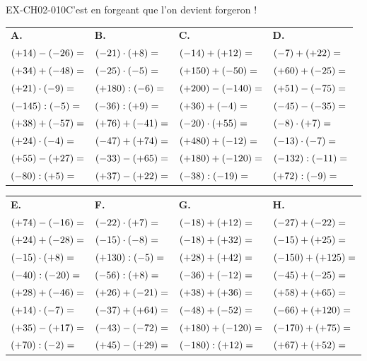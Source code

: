 \documentclass[12pt, a4paper]{article}
\begin{document}
\begin{exercice}{EX-CH02-010}{C’est en forgeant que l’on devient forgeron !}

{\small
\bigskip
\def\arraystretch{1.25}
\begin{tabularx}{\linewidth}{*{4}{X}}
\textbf{A.} & \textbf{B.} & \textbf{C.} & \textbf{D.} \\
$(+14)-(-26)= \dotfill$ & $(-21)\cdot(+8)= \dotfill$ & $(-14)+(+12)= \dotfill$ & $(-7)+(+22)= \dotfill$ \\
$(+34)+(-48)= \dotfill$ & $(-25)\cdot(-5)= \dotfill$ & $(+150)+(-50)= \dotfill$ & $(+60)+(-25)= \dotfill$ \\
$(+21)\cdot(-9)= \dotfill$ & $(+180):(-6)= \dotfill$ & $(+200)-(-140)= \dotfill$ & $(+51)-(-75)= \dotfill$ \\
$(-145):(-5)= \dotfill$ & $(-36):(+9)= \dotfill$ & $(+36)+(-4)= \dotfill$ & $(-45)-(-35)= \dotfill$ \\
$(+38)+(-57)= \dotfill$ & $(+76)+(-41)= \dotfill$ & $(-20)\cdot(+55)= \dotfill$ & $(-8)\cdot(+7)= \dotfill$ \\
$(+24)\cdot(-4)= \dotfill$ & $(-47)+(+74)= \dotfill$ & $(+480)+(-12)= \dotfill$ & $(-13)\cdot(-7)= \dotfill$ \\
$(+55)-(+27)= \dotfill$ & $(-33)-(+65)= \dotfill$ & $(+180)+(-120)= \dotfill$ & $(-132):(-11)= \dotfill$ \\
$(-80):(+5)= \dotfill$ & $(+37)-(+22)= \dotfill$ & $(-38):(-19)= \dotfill$ & $(+72):(-9)= \dotfill$ \\
\end{tabularx}

\bigskip
\begin{tabularx}{\linewidth}{*{4}{X}}
\textbf{E.} & \textbf{F.} & \textbf{G.} & \textbf{H.} \\
$(+74)-(-16)= \dotfill$ & $(-22)\cdot(+7)= \dotfill$ & $(-18)+(+12)= \dotfill$ & $(-27)+(-22)= \dotfill$ \\
$(+24)+(-28)= \dotfill$ & $(-15)\cdot(-8)= \dotfill$ & $(-18)+(+32)= \dotfill$ & $(-15)+(+25)= \dotfill$ \\
$(-15)\cdot(+8)= \dotfill$ & $(+130):(-5)= \dotfill$ & $(+28)+(+42)= \dotfill$ & $(-150)+(+125)= \dotfill$ \\
$(-40):(-20)= \dotfill$ & $(-56):(+8)= \dotfill$ & $(-36)+(-12)= \dotfill$ & $(-45)+(-25)= \dotfill$ \\
$(+28)+(-46)= \dotfill$ & $(+26)+(-21)= \dotfill$ & $(+38)+(+36)= \dotfill$ & $(+58)+(+65)= \dotfill$ \\
$(+14)\cdot(-7)= \dotfill$ & $(-37)+(+64)= \dotfill$ & $(-48)+(-52)= \dotfill$ & $(-66)+(+120)= \dotfill$ \\
$(+35)-(+17)= \dotfill$ & $(-43)-(-72)= \dotfill$ & $(+180)+(-120)= \dotfill$ & $(-170)+(+75)= \dotfill$ \\
$(+70):(-2)= \dotfill$ & $(+45)-(+29)= \dotfill$ & $(-180):(+12)= \dotfill$ & $(+67)+(+52)= \dotfill$ \\
\end{tabularx}

}
\end{exercice}
\end{document}
